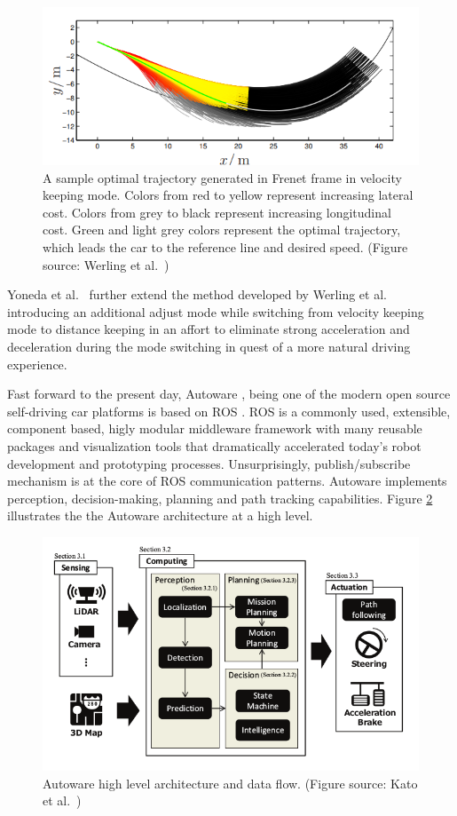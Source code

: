 \begin{figure}[h]
  \centering
  \includegraphics[width=.8\textwidth]{figures/frenet-velocity-keeping.png}
  \caption[A sample optimal trajectory generated in Frenet frame]{A sample
    optimal trajectory generated in Frenet frame in velocity keeping mode.
    Colors from red to yellow represent increasing lateral cost. Colors from
    grey to black represent increasing longitudinal cost. Green and light grey
    colors represent the optimal trajectory, which leads the car to the
    reference line and desired speed. (Figure source: Werling et al.\
    \cite{Werling2010OptimalTG})}
  \label{figure:frenet-velocity-keeping}
\end{figure}

Yoneda et al.\ \cite{Yoneda2018TrajectoryOA} further extend the method developed
by Werling et al.\ \cite{Werling2010OptimalTG} introducing an additional adjust
mode while switching from velocity keeping mode to distance keeping in an
affort to eliminate strong acceleration and deceleration during the mode
switching in quest of a more natural driving experience.

Fast forward to the present day, Autoware \cite{Kato2018AutowareOB}, being one
of the modern open source self-driving car platforms is based on ROS
\cite{Quigley2009ROSAO}. ROS is a commonly used, extensible, component based,
higly modular middleware framework with many reusable packages and
visualization tools that dramatically accelerated today's robot development and
prototyping processes. Unsurprisingly, publish/subscribe mechanism is at the
core of ROS communication patterns. Autoware implements perception,
decision-making, planning and path tracking capabilities. Figure
\ref{figure:autoware} illustrates the the Autoware architecture at a high
level.

\begin{figure}[h]
  \centering
  \includegraphics[width=.8\textwidth]{figures/autoware.png}
  \caption[Autoware high level architecture]{Autoware high level architecture
    and data flow. (Figure source: Kato et al.\ \cite{Kato2018AutowareOB})}
  \label{figure:autoware}
\end{figure}

